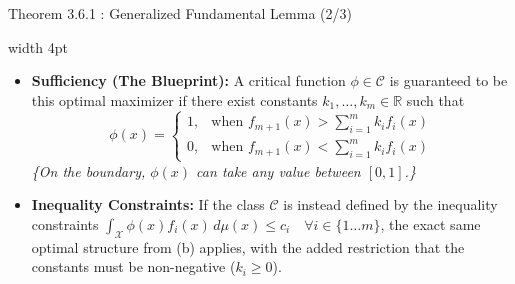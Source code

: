 \documentclass[10pt, aspectratio=169, xcolor=dvipsnames]{beamer}
\newcommand{\lead}[1]{{\color{UniBlue}\bfseries #1}}
\begin{document}
\begin{frame}{Theorem 3.6.1 : Generalized Fundamental Lemma (2/3)}
    
    \noindent
    {\color{Teal}\vrule width 4pt}%
    \hspace{10pt}%
    \begin{minipage}{\dimexpr\textwidth-14pt\relax}
        \color{Slate}
        \begin{itemize}
            \item[{\tikz[baseline=(char.base)]{\node[shape=circle,draw=Teal,inner sep=1pt,text=Teal,font=\scriptsize\bfseries] (char) {b};}}] \lead{Sufficiency (The Blueprint):} A critical function $\phi \in \mathcal{C}$ is guaranteed to be this optimal maximizer if there exist constants $k_1, \dots, k_m \in \mathbb{R}$ such that
            \[
            \phi(x) = \begin{cases} 
            1, & \text{when } f_{m+1}(x) > \sum_{i=1}^m k_i f_i(x) \\[6pt]
            0, & \text{when } f_{m+1}(x) < \sum_{i=1}^m k_i f_i(x) 
            \end{cases}
            \]
            \textit{\{On the boundary, $\phi(x)$ can take any value between $[0,1]$.\}}
            
            \vspace{0.6cm}
            \item[{\tikz[baseline=(char.base)]{\node[shape=circle,draw=Teal,inner sep=1pt,text=Teal,font=\scriptsize\bfseries] (char) {c};}}] \lead{Inequality Constraints:} If the class $\mathcal{C}$ is instead defined by the inequality constraints $\displaystyle \int_{\mathcal{X}} \phi(x) f_i(x) \, d\mu(x) \le c_i \quad \forall i \in \{1 \dots m\}$, the exact same optimal structure from (b) applies, with the added restriction that the constants must be non-negative ($k_i \ge 0$).
        \end{itemize}
    \end{minipage}
\end{frame}
\end{document}
